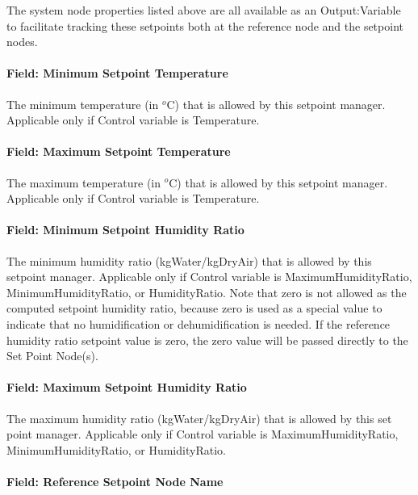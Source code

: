 The system node properties listed above are all available as an Output:Variable to facilitate tracking these setpoints both at the reference node and the setpoint nodes.

\paragraph{Field: Minimum Setpoint Temperature}\label{field-minimum-setpoint-temperature}

The minimum temperature (in \(^{o}\)C) that is allowed by this setpoint manager. Applicable only if Control variable is Temperature.

\paragraph{Field: Maximum Setpoint Temperature}\label{field-maximum-setpoint-temperature}

The maximum temperature (in \(^{o}\)C) that is allowed by this setpoint manager. Applicable only if Control variable is Temperature.

\paragraph{Field: Minimum Setpoint Humidity Ratio}\label{field-minimum-setpoint-humidity-ratio}

The minimum humidity ratio (kgWater/kgDryAir) that is allowed by this setpoint manager. Applicable only if Control variable is MaximumHumidityRatio, MinimumHumidityRatio, or HumidityRatio. Note that zero is not allowed as the computed setpoint humidity ratio, because zero is used as a special value to indicate that no humidification or dehumidification is needed. If the reference humidity ratio setpoint value is zero, the zero value will be passed directly to the Set Point Node(s).

\paragraph{Field: Maximum Setpoint Humidity Ratio}\label{field-maximum-setpoint-humidity-ratio}

The maximum humidity ratio (kgWater/kgDryAir) that is allowed by this set point manager. Applicable only if Control variable is MaximumHumidityRatio, MinimumHumidityRatio, or HumidityRatio.

\paragraph{Field: Reference Setpoint Node Name}\label{field-reference-setpoint-node-name-1}

